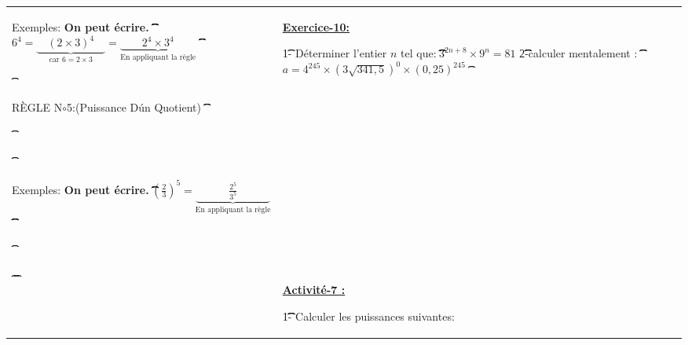 \documentclass[11pt,a4paper,landscape]{article}
\begin{document}
\begin{longtable}{|>{\centering\arraybackslash}p{3cm}|>{\raggedright\arraybackslash}p{5cm}|>{\raggedright\arraybackslash}p{13.5cm}|>{\raggedright\arraybackslash}p{5cm}|}
\begin{BoxRafa}[colbacktitle = Orange]{Exemples:}
\t\t\t\textbf{On peut écrire.}
\t\t\t
\t\t\t$6^{4}=\underbrace{\quad\left(2\times3\right)^{4}\quad}_{\text{car } 6=2\times3}=\underbrace{\qquad2^{4}\times3^{4}\qquad}_{\text{En appliquant la règle}}$
\t\t\t
\t\t\end{BoxRafa}
\t\t\begin{BoxRafa}[colbacktitle = green]{RÈGLE N$\circ$5:(Puissance D\'un Quotient)}
\t\t\t\hspace*{1.5cm}\begin{tikzpicture}[
\t\t\t\troundnode/.style={circle, draw=green!60, fill=green!5, very thick, minimum size=7mm},
\t\t\t\tsquarednode/.style={rectangle, draw=red!60, fill=red!5, very thick, minimum size=5mm},
\t\t\t]
\t\t\t%
\t\t\t\tnode[squarednode]\t(maintopic)\t{$\underbrace{\qquad\qquad\left(\frac ab\right)^m\qquad\qquad}_{\text{On élève un quotient à une puissance}}=\underbrace{\qquad\qquad\frac{a^m}{b^m}\qquad\qquad}_{\text{On distribue les puissances}}$};
\t\t\t\t%
\t\t\t\t%
\t\t\t\t%
\t\t\t\t
\t\t\t%
\t\t\t\t%
\t\t\t\t%
\t\t\t\t%
\t\t\t\t%
\t\t\t\end{tikzpicture}\vspace{-.1cm}
\t\t\end{BoxRafa}
\t\t\begin{BoxRafa}[colbacktitle = Orange]{Exemples:}
\t\t\t\textbf{On peut écrire.}
\t\t\t
\t\t\t$\left(\frac23\right)^5=\underbrace{\quad\qquad\frac{2^5}{3^5}\quad\qquad}_{\text{En appliquant la règle}}$
\t\t\t
\t\t\end{BoxRafa}
\t\t&
\t\t\colorbox{yellow!50!white}{\uline{\sffamily \textbf{Exercice-10:}}}\par
\t\t1- Déterminer l’entier $n$ tel que:
\t\t
\t\t$3^{2n+8}\times9^n=81$
\t\t
\t\t2-calculer mentalement :
\t\t
\t\t$a{=}4^{245}{\times}(3\sqrt{341,5})^0{\times}(0,25)^{245}$
\t\t\\
\t\t\hline
\t\t&\t
\t\t\colorbox{yellow!50!white}{\uline{\sffamily \textbf{Activité-7 :} }}\par%
\t\t
\t\t1- Calculer les puissances suivantes:

\end{longtable}
\end{document}
